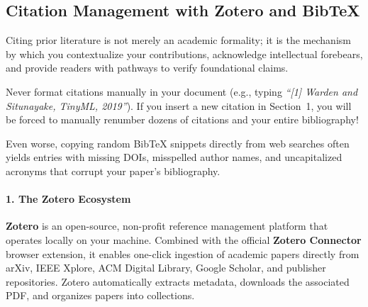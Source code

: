 \subsection{Citation Management with Zotero and Bib\TeX{}}\label{subsec:zotero_bibtex}

Citing prior literature is not merely an academic formality; it is the mechanism by which you contextualize your contributions, acknowledge intellectual forebears, and provide readers with pathways to verify foundational claims.

\begin{warning}
Never format citations manually in your document (e.g., typing \emph{``[1] Warden and Situnayake, TinyML, 2019''}). If you insert a new citation in Section~1, you will be forced to manually renumber dozens of citations and your entire bibliography!

Even worse, copying random Bib\TeX{} snippets directly from web searches often yields entries with missing DOIs, misspelled author names, and uncapitalized acronyms that corrupt your paper's bibliography.
\end{warning}

\paragraph{1. The Zotero Ecosystem}
\textbf{Zotero} is an open-source, non-profit reference management platform that operates locally on your machine. Combined with the official \textbf{Zotero Connector} browser extension, it enables one-click ingestion of academic papers directly from arXiv, IEEE Xplore, ACM Digital Library, Google Scholar, and publisher repositories. Zotero automatically extracts metadata, downloads the associated PDF, and organizes papers into collections.

